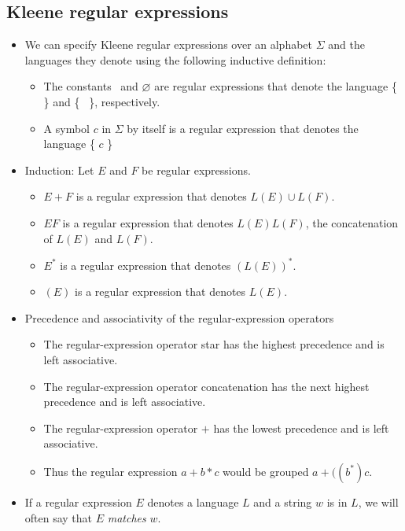 \documentclass[]{article}
\begin{document}
  \subsection*{Kleene regular expressions}
    \begin{itemize}
      \item We can specify Kleene regular expressions over an alphabet $\Sigma$
            and the languages they denote using the following inductive
            definition:
        \begin{itemize}
          \item The constants \textepsilon \, and $\varnothing$ are regular
                expressions that denote the language \{ \textepsilon \, \} and
                \{ \, \}, respectively.
          \item A symbol $c$ in $\Sigma$ by itself is a regular expression that
                denotes the language \{ $c$ \}
        \end{itemize}
      \item Induction: Let $E$ and $F$ be regular expressions.
        \begin{itemize}
          \item $E + F$ is a regular expression that denotes $L(E) \cup L(F)$.
          \item $EF$ is a regular expression that denotes $L(E)L(F)$, the
                concatenation of $L(E)$ and $L(F)$.
          \item $E^*$ is a regular expression that denotes $(L(E))^*$.
          \item $(E)$ is a regular expression that denotes $L(E)$.
        \end{itemize}
      \item Precedence and associativity of the regular-expression operators
        \begin{itemize}
          \item The regular-expression operator star has the highest precedence
                and is left associative.
          \item The regular-expression operator concatenation has the next
                highest precedence and is left associative.
          \item The regular-expression operator $+$ has the lowest precedence
                and is left associative.
          \item Thus the regular expression $a + b * c$ would be grouped $a + ((
                b^*)c$.
        \end{itemize}
      \item If a regular expression $E$ denotes a language $L$ and a string $w$
            is in $L$, we will often say that $E$ \emph{matches} $w$.
    \end{itemize}
\end{document}
